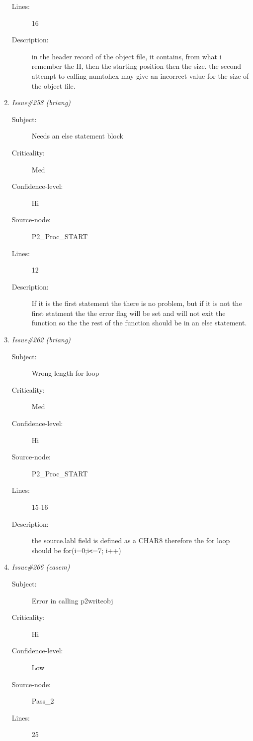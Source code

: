 \begin{enumerate}
\begin{description}
\item [Lines:] 16

\item [Description:] in the header record of the object file, it contains, from what i remember
the H, then the starting position then the size.  the second attempt to
calling numtohex may give an incorrect value for the size of the object file.
\end{description}
\item {\it Issue\#258 (briang)}
\begin{description}
\item [Subject:] Needs an else statement block
\item [Criticality:] Med
\item [Confidence-level:] Hi
\item [Source-node:] P2\_Proc\_START

\item [Lines:] 12

\item [Description:] If it is the first statement the there is no
problem, but if it is not the first statment the the error flag will be set
and will not exit the function so the the rest of the function should be in
an else statement.
\end{description}
\item {\it Issue\#262 (briang)}
\begin{description}
\item [Subject:] Wrong length for loop
\item [Criticality:] Med
\item [Confidence-level:] Hi
\item [Source-node:] P2\_Proc\_START

\item [Lines:] 15-16

\item [Description:] the source.labl field is defined as a CHAR8
therefore the for loop should be for(i=0;i{\tt <}=7; i++)
\end{description}
\item {\it Issue\#266 (casem)}
\begin{description}
\item [Subject:] Error in calling p2writeobj
\item [Criticality:] Hi
\item [Confidence-level:] Low
\item [Source-node:] Pass\_2

\item [Lines:] 25


\end{description}
\end{enumerate}
